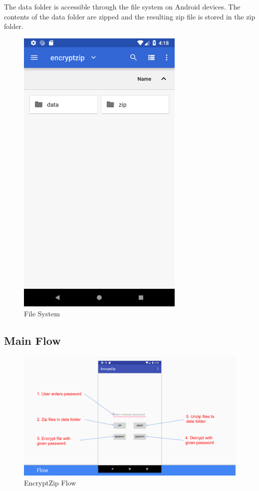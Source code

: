 \documentclass[10pt,a4paper]{article}
\begin{document}
The data folder is accessible through the file system on Android devices. The contents of the data folder are zipped and the resulting zip file is stored in the zip folder.
\begin{figure}[H]
\centering
\includegraphics[width=8cm]{file1}
\caption{File System}
\end{figure}

\clearpage

\subsection{Main Flow}

\begin{figure}[H]
\centering
\includegraphics[width=\textwidth]{flow1}
\caption{EncryptZip Flow}
\end{figure}
\end{document}
